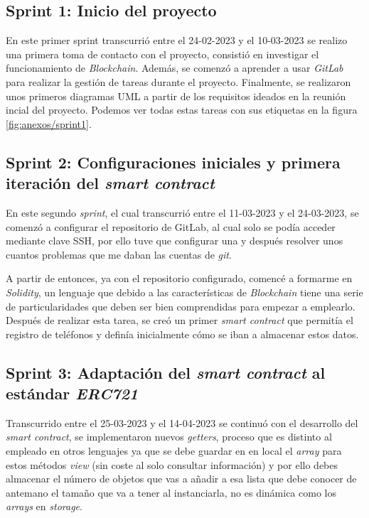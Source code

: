 \subsection{Sprint 1: Inicio del proyecto}


En este primer sprint transcurrió entre el 24-02-2023 y el 10-03-2023  se realizo una primera toma de contacto con el proyecto, consistió en investigar el funcionamiento de \textit{Blockchain}. Además, se comenzó a aprender a usar \textit{GitLab} para realizar la gestión de tareas durante el proyecto. Finalmente, se realizaron unos primeros diagramas UML a partir de los requisitos ideados en la reunión incial del proyecto. Podemos ver todas estas tareas con sus etiquetas en la figura \ref{fig:anexos/sprint1}.

\subsection{Sprint 2: Configuraciones iniciales y primera iteración del \textit{smart contract}}


En este segundo \textit{sprint}, el cual transcurrió entre el 11-03-2023 y el 24-03-2023, se comenzó a configurar el repositorio de GitLab, al cual solo se podía acceder mediante clave SSH, por ello tuve que configurar una y después resolver unos cuantos problemas que me daban las cuentas de \textit{git}.

A partir de entonces, ya con el repositorio configurado, comencé a formarme en \textit{Solidity}, un lenguaje que debido a las características de \textit{Blockchain} tiene una serie de particularidades que deben ser bien comprendidas para empezar a emplearlo. Después de realizar esta tarea, se creó un primer \textit{smart contract} que permitía el registro de teléfonos y definía inicialmente cómo se iban a almacenar estos datos.

\subsection{Sprint 3: Adaptación del \textit{smart contract} al estándar \textit{ERC721}}

Transcurrido entre el 25-03-2023 y el 14-04-2023 se continuó con el desarrollo del \textit{smart contract}, se implementaron nuevos \textit{getters}, proceso que es distinto al empleado en otros lenguajes ya que se debe guardar en en local el \textit{array} para estos métodos \textit{view} (sin coste al solo consultar información) y por ello debes almacenar el número de objetos que vas a añadir a esa lista que debe conocer de antemano el tamaño que va a tener al instanciarla, no es dinámica como los \textit{arrays} en \textit{storage}.

